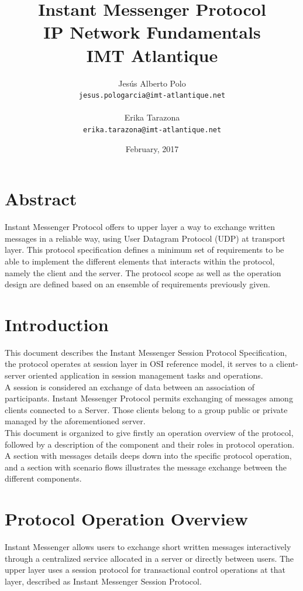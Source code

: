 \documentclass{article}
\title{
    Instant Messenger Protocol\\
    \large IP Network Fundamentals\\
    IMT Atlantique
}
\author{
    Jesús Alberto Polo\\ \texttt{jesus.pologarcia@imt-atlantique.net}\\\\
    Erika Tarazona\\ \texttt{erika.tarazona@imt-atlantique.net}
}
\date{February, 2017}
\begin{document}
\maketitle

\section{Abstract}
Instant Messenger Protocol offers to upper layer a way to exchange written messages in a reliable way, using User Datagram Protocol (UDP) at transport layer. This protocol specification defines a minimum set of requirements to be able to implement the different elements that interacts within the protocol, namely the client and the server. The protocol scope as well as the operation design are defined based on an ensemble of requirements previously given.   

\tableofcontents
\cleardoublepage

\section{Introduction}

This document describes the Instant Messenger Session Protocol Specification, the protocol operates at session layer in OSI reference model, it serves to a client-server oriented application in session management tasks and operations.\\

A session is considered an exchange of data between an association of participants. Instant Messenger Protocol permits exchanging of messages among clients connected to a Server. Those clients belong to a group public or private managed by the aforementioned server.\\

This document is organized to give firstly an operation overview of the protocol, followed by a description of the component and their roles in protocol operation. A section with messages details deeps down into the specific protocol operation, and a section with scenario flows illustrates the message exchange between the different components.

\section{Protocol Operation Overview}

Instant Messenger allows users to exchange short written messages interactively through a centralized service allocated in a server or directly between users. The upper layer uses a session protocol for transactional control operations at that layer, described as Instant Messenger Session Protocol.
\end{document}
